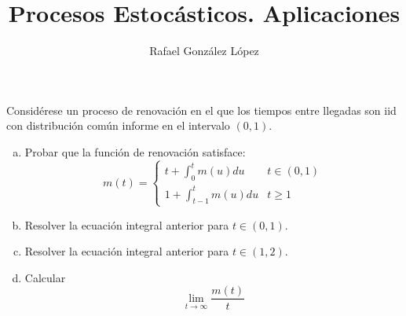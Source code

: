 \documentclass[twoside]{article}
\begin{document}
\title{Procesos Estocásticos. Aplicaciones}
\author{Rafael González López}
\maketitle
\begin{ejercicio}{1} 
Considérese un proceso de renovación en el que los tiempos entre llegadas son iid con distribución común informe en el intervalo $(0,1)$.
\begin{enumerate}[a)]
\item Probar que la función de renovación satisface:
$$
m(t) = \begin{cases}
t+\int_0^t m(u)du & t\in(0,1)\\
1+\int_{t-1}^tm(u)du & t\geq 1
\end{cases}
$$
\item Resolver la ecuación integral anterior para $t\in(0,1)$.
\item Resolver la ecuación integral anterior para $t\in(1,2)$.
\item Calcular 
$$
\lim_{t\to\infty}\frac{m(t)}{t}
$$
\end{enumerate}
\end{ejercicio}
\end{document}
